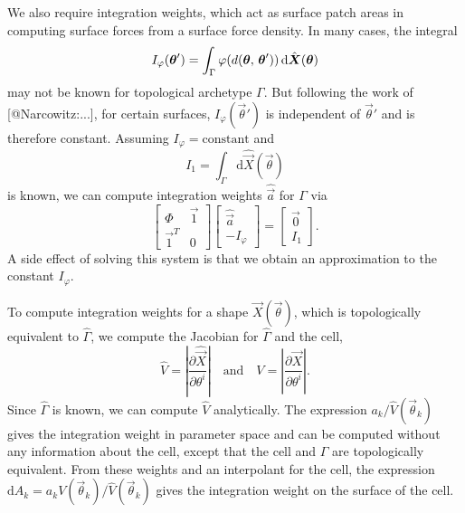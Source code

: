 We also require integration weights, which act as surface patch areas in
computing surface forces from a surface force density. In many cases, the
integral
\begin{equation}
    I_\varphi(\vec{\theta}') = \int_\Gamma \varphi(d(\vec{\theta},\,\vec{\theta}'))\mskip\thinmuskip\mathrm{d}\hat{\vec{X}}(\vec{\theta})
\end{equation}
may not be known for topological archetype $\Gamma$. But
following the work of [@Narcowitz:...], for certain surfaces,
$I_\varphi(\vec{\theta}')$ is independent of $\vec{\theta}'$ and is therefore
constant. Assuming $I_\varphi = \text{constant}$ and
\begin{equation}
    I_1 = \int_\Gamma \mathrm{d}\hat{\vec{X}}(\vec{\theta})
\end{equation}
is known, we can compute integration weights $\hat{\vec{a}}$ for $\Gamma$ via
\begin{equation}
    \left[\begin{array}{cc}\Phi &\vec{1} \\ \vec{1}^T & 0\end{array}\right]
    \left[\begin{array}{c}\hat{\vec{a}}\\-I_\varphi\end{array}\right] =
    \left[\begin{array}{c}\vec{0}\\I_1\end{array}\right].
\end{equation}
A side effect of solving this system is that we obtain an approximation to
the constant $I_\varphi$.

To compute integration weights for a shape $\vec{X}(\vec{\theta})$, which is
topologically equivalent to $\hat{\Gamma}$, we compute the
Jacobian for $\hat{\Gamma}$ and the cell,
\begin{equation}
    \hat{V}=\left|\frac{\partial\hat{\vec{X}}}{\partial\theta^i}\right| \quad \text{and} \quad
    V=\left|\frac{\partial\vec{X}}{\partial\theta^i}\right|.
\end{equation}
Since $\hat{\Gamma}$ is known, we can compute $\hat{V}$ analytically. The
expression $a_k/\hat{V}(\vec{\theta}_k)$ gives the integration weight in
parameter space and can be computed without any information about the cell,
except that the cell and $\Gamma$ are topologically equivalent. From these
weights and an interpolant for the cell, the expression
$\mathrm{d}A_k=a_k V(\vec{\theta}_k)/\hat{V}(\vec{\theta}_k)$ gives the
integration weight on the surface of the cell.


